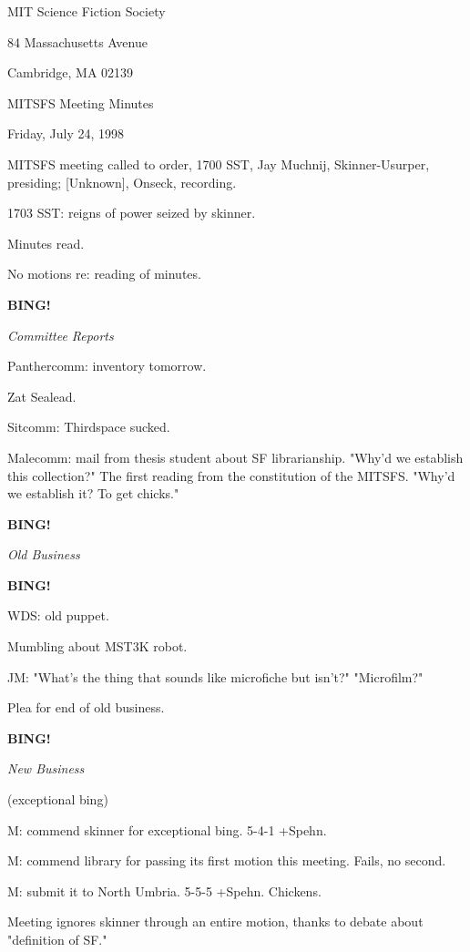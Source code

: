 \documentclass[12pt]{article}
\newcommand{\bing}{{\bf BING!} }
\newcommand{\goto}[1]{\bing \vskip 12pt \centerline{{\em{#1}}}}
\begin{document}
\begin{center}

MIT Science Fiction Society 

84 Massachusetts Avenue

Cambridge, MA 02139

\vspace{12pt}

MITSFS Meeting Minutes 

Friday, July 24, 1998

\end{center}
 
\vspace{18pt}

\setlength{\parskip}{6pt}

\noindent
MITSFS meeting called to order, 1700 SST,
Jay Muchnij, Skinner-Usurper, presiding; [Unknown], Onseck, recording.

1703 SST: reigns of power seized by skinner.

Minutes read.

No motions re: reading of minutes.

\goto{Committee Reports}

Panthercomm: inventory tomorrow.

Zat Sealead.

Sitcomm: Thirdspace sucked.

Malecomm: mail from thesis student about SF librarianship. "Why'd we establish this collection?" The first reading from the constitution of the MITSFS. "Why'd we establish it? To get chicks."

\goto{Old Business}

\bing

WDS: old puppet.

Mumbling about MST3K robot.

JM: "What's the thing that sounds like microfiche but isn't?" "Microfilm?"

Plea for end of old business.

\goto{New Business}

(exceptional bing)

M: commend skinner for exceptional bing. 5-4-1 +Spehn.

M: commend library for passing its first motion this meeting. Fails, no second.

M: submit it to North Umbria. 5-5-5 +Spehn. Chickens.

Meeting ignores skinner through an entire motion, thanks to debate about "definition of SF."
\end{document}
